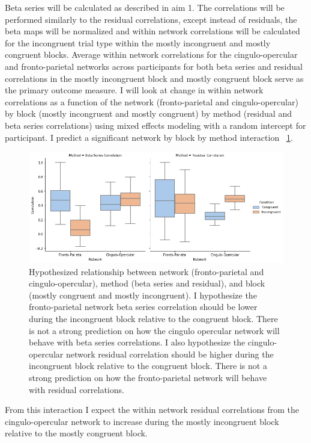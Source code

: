 \documentclass[phd,appendix,figures]{uithesis}
\begin{document}
\begin{itemize}
Beta series will be calculated as described in aim 1.
The correlations will be performed similarly to the residual correlations, except instead of residuals, the beta maps will be normalized and within network correlations will be calculated for the incongruent trial type within the mostly incongruent and mostly congruent blocks.
Average within network correlations for the cingulo-opercular and fronto-parietal networks across participants for both beta series and residual correlations in the mostly incongruent block and mostly congruent block serve as the primary outcome measure.
I will look at change in within network correlations as a function of the network (fronto-parietal and cingulo-opercular) by block (mostly incongruent and mostly congruent) by method (residual and beta series correlations) using mixed effects modeling with a random intercept for participant.
I predict a significant network by block by method interaction ~\ref{fig:aim_2_validation}.
\begin{figure}[H]%
	\centering
	\includegraphics[width=1\linewidth]{aim_2_validation}
	\caption{Hypothesized relationship between network (fronto-parietal and cingulo-opercular), method (beta series and residual), and block (mostly congruent and mostly incongruent).
	I hypothesize the fronto-parietal network beta series correlation should be lower during the incongruent block relative to the congruent block.
	There is not a strong prediction on how the cingulo opercular network will behave with beta series correlations.
	I also hypothesize the cingulo-opercular network residual correlation should be higher during the incongruent block relative to the congruent block.
	There is not a strong prediction on how the fronto-parietal network will behave with residual correlations.}
	\label{fig:aim_2_validation}
\end{figure}
From this interaction I expect the within network residual correlations from the cingulo-opercular network to increase during the mostly incongruent block relative to the mostly congruent block.

\end{itemize}
\end{document}
